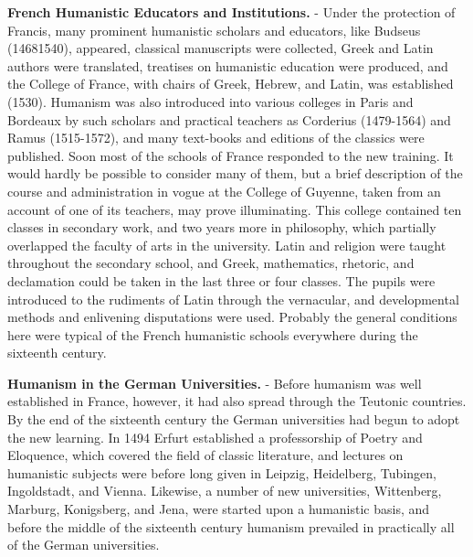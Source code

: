 \documentclass[
]{book}
\begin{document}
\textbf{French Humanistic Educators and Institutions.} - Under the protection of Francis, many prominent humanistic scholars and educators, like Budseus (14681540), appeared, classical manuscripts were collected, Greek and Latin authors were translated, treatises on humanistic education were produced, and the College of France, with chairs of Greek, Hebrew, and Latin, was established (1530). Humanism was also introduced into various colleges in Paris and Bordeaux by such scholars and practical teachers as Corderius (1479-1564) and Ramus (1515-1572), and many text-books and editions of the classics were published. Soon most of the schools of France responded to the new training. It would hardly be possible to consider many of them, but a brief description of the course and administration in vogue at the College of Guyenne, taken from an account of one of its teachers, may prove illuminating. This college contained ten classes in secondary work, and two years more in philosophy, which partially overlapped the faculty of arts in the university. Latin and religion were taught throughout the secondary school, and Greek, mathematics, rhetoric, and declamation could be taken in the last three or four classes. The pupils were introduced to the rudiments of Latin through the vernacular, and developmental methods and enlivening disputations were used. Probably the general conditions here were typical of the French humanistic schools everywhere during the sixteenth century.

\textbf{Humanism in the German Universities.} - Before humanism was well established in France, however, it had also spread through the Teutonic countries. By the end of the sixteenth century the German universities had begun to adopt the new learning. In 1494 Erfurt established a professorship of Poetry and Eloquence, which covered the field of classic literature, and lectures on humanistic subjects were before long given in Leipzig, Heidelberg, Tubingen, Ingoldstadt, and Vienna. Likewise, a number of new universities, Wittenberg, Marburg, Konigsberg, and Jena, were started upon a humanistic basis, and before the middle of the sixteenth century humanism prevailed in practically all of the German universities.
\end{document}
